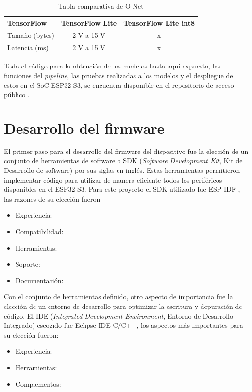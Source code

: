 \begin{table}[h]
	\centering
	\caption[Modelos comparativa]{Tabla comparativa de O-Net}
	\begin{tabular}{lcc}   
		\toprule
		\textbf{TensorFlow} & \textbf{TensorFlow Lite} & \textbf{TensorFlow Lite int8} \\
		\midrule
		Tamaño (bytes) & 2 V a 15 V & x \\
		Latencia (ms) & 2 V a 15 V & x \\
		\bottomrule
		\hline
	\end{tabular}
	\label{tab:models_comp}
\end{table}

Todo el código para la obtención de los modelos hasta aquí expuesto, las funciones del \textit{pipeline}, las pruebas realizadas a los modelos y el despliegue de estos en el SoC ESP32-S3, se encuentra disponible en el repositorio de acceso público \cite{mtcnn_repo}.

\section{Desarrollo del firmware}
El primer paso para el desarrollo del firmware del dispositivo fue la elección de un conjunto de herramientas de software o SDK (\textit{Software Development Kit}, Kit de Desarrollo de software) por sus siglas en inglés. Estas herramientas permitieron implementar código para utilizar de manera eficiente todos los periféricos disponibles en el ESP32-S3. Para este proyecto el SDK utilizado fue ESP-IDF \cite{idf_repo}, las razones de su elección fueron:
\begin{itemize}
	\item Experiencia:
	\item Compatibilidad:
	\item Herramientas:
	\item Soporte:
	\item Documentación:
\end{itemize}

Con el conjunto de herramientas definido, otro aspecto de importancia fue la elección de un entorno de desarrollo para optimizar la escritura y depuración de código. El IDE (\textit{Integrated Development Environment}, Entorno de Desarrollo Integrado) escogido fue Eclipse IDE C/C++, los aspectos más importantes para su elección fueron:
\begin{itemize}
	\item Experiencia:
	\item Herramientas:
	\item Complementos: 
\end{itemize}

